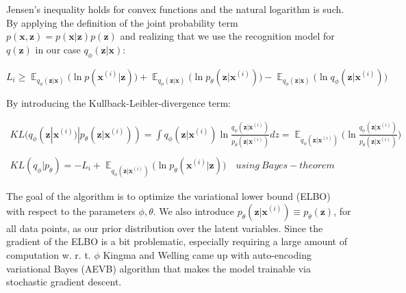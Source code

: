 \documentclass[11pt, english]{article}
\DeclareMathOperator*{\E}{\mathbb{E}}
\begin{document}
\vspace{3mm}

\par Jensen's inequality holds for convex functions and the natural logarithm is such. By applying the definition of the joint probability term $p(\bm{x}, \bm{z}) = p(\bm{x} | \bm{z})p(\bm{z})$ and realizing that we use the recognition model for $q(\bm{z})$ in our case $q_{\phi}(\bm{z} | \bm{x})$:

\vspace{3mm}

\begin{equation}
    L_{i} \geq \E_{q_{\phi}(\bm{z} | \bm{x})} \Big( \ln p(\bm{x}^{(i)} | \bm{z}) \Big) + \E_{q_{\phi}(\bm{z} | \bm{x})} \Big( \ln p_{\theta}(\bm{z} | \bm{x}^{(i)}) \Big) - \E_{q_{\phi}(\bm{z} | \bm{x})} \Big( \ln q_{\phi}(\bm{z} | \bm{x}^{(i)}) \Big)
\end{equation}

\vspace{3mm}

\par By introducing the Kullback-Leibler-divergence term:

\vspace{3mm}

\begin{gather*}
    KL(q_{\phi}(\bm{z} | \bm{x}^{(i)}) | p_{\theta}(\bm{z} | \bm{x}^{(i)})) = \int q_{\phi}(\bm{z} | \bm{x}^{(i)})\ln \frac{q_{\phi}(\bm{z} | \bm{x}^{(i)})}{p_{\theta}(\bm{z} | \bm{x}^{(i)})}dz = \E_{q_{\phi}(\bm{z} | \bm{x}^{(i)})} \Big( \ln \frac{q_{\phi}(\bm{z} | \bm{x}^{(i)})}{p_{\theta}(\bm{z}|\bm{x}^{(i)})}  \Big) \\ \\
    KL(q_{\phi} | p_{\theta}) = -L_{i} + \E_{q_{\phi}(\bm{z} | \bm{x}^{(i)})} \Big( \ln p_{\theta}(\bm{x}^{(i)} | \bm{z}) \Big) \quad using\ Bayes-theorem
\end{gather*}

\vspace{3mm}

\par The goal of the algorithm is to optimize the variational lower bound (ELBO) with respect to the parameters $\phi, \theta$. We also introduce $p_{\theta}(\bm{z} | \bm{x}^{(i)}) \equiv p_{\theta}(\bm{z})$, for all data points, as our prior distribution over the latent variables. Since the gradient of the ELBO is a bit problematic, especially requiring a large amount of computation w. r. t. $\phi$ Kingma and Welling came up with auto-encoding variational Bayes (AEVB) algorithm that makes the model trainable via stochastic gradient descent.
\end{document}
